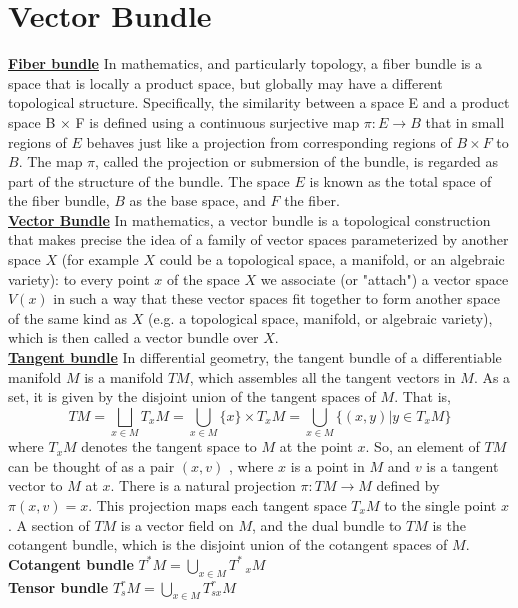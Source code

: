 \section{Vector Bundle}
\begin{newdef}
\href{https://en.wikipedia.org/wiki/Fiber_bundle}{\textbf{Fiber bundle}} In mathematics, and particularly topology, a fiber bundle is a space that is locally a product space, but globally may have a different topological structure. Specifically, the similarity between a space E and a product space B × F is defined using a continuous surjective map $\pi :E \to B$ that in small regions of $E$ behaves just like a projection from corresponding regions of $B \times F$ to $B$. The map $\pi$, called the projection or submersion of the bundle, is regarded as part of the structure of the bundle. The space $E$ is known as the total space of the fiber bundle, $B$ as the base space, and $F$ the fiber.\\
\href{https://en.wikipedia.org/wiki/Vector_bundle}{\textbf{Vector Bundle}} 
In mathematics, a vector bundle is a topological construction that makes precise the idea of a family of vector spaces parameterized by another space $X$ (for example $X$ could be a topological space, a manifold, or an algebraic variety): to every point $x$ of the space $X$ we associate (or "attach") a vector space $V(x)$ in such a way that these vector spaces fit together to form another space of the same kind as $X$ (e.g. a topological space, manifold, or algebraic variety), which is then called a vector bundle over $X$.\\
\href{https://en.wikipedia.org/wiki/Tangent_bundle}{\textbf{Tangent bundle}} 
In differential geometry, the tangent bundle of a differentiable manifold $M$ is a manifold $TM$, which assembles all the tangent vectors in $M$. As a set, it is given by the disjoint union of the tangent spaces of $M$. That is,
\[
TM = \bigsqcup_{x \in M}T_xM = \bigcup_{x \in M} \{x\} \times T_xM = \bigcup_{x \in M}\{(x,y)| y \in T_xM \}
\]
where $T_xM$ denotes the tangent space to $M$ at the point $x$. So, an element of $TM$ can be thought of as a pair $(x,v)$ , where $x$ is a point in $M$ and $v$ is a tangent vector to $M$ at $x$. There is a natural projection $\pi : TM \to M$ defined by $\pi(x,v) = x$. This projection maps each tangent space $T_xM$ to the single point $x$. A section of $TM$ is a vector field on $M$, and the dual bundle to $TM$ is the cotangent bundle, which is the disjoint union of the cotangent spaces of $M$.\\
\textbf{Cotangent bundle} $T^*M = \bigcup_{x \in M} T^*_{\phantom{*}x}M$\\
\textbf{Tensor bundle} $T^r_sM = \bigcup_{x \in M} T^{r\phantom{x}}_{sx}M$\\
\end{newdef}


